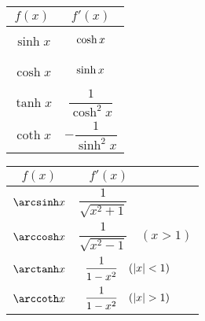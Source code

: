 \begin{blueBox}
\begin{minipage}{0.35\textwidth}
\begin{center}
    \end{center}
  \end{minipage}%
  \begin{minipage}{0.25\textwidth}
    \def\arraystretch{1.5}
    \begin{tabular}{c | c}
      $f(x)$    & $f'(x)$                                      \\ \toprule
      $\sinh x$ & $\cosh x \vphantom{\dfrac{1}{\sqrt{x^2-1}}}$ \\ [2mm]
      $\cosh x$ & $\sinh x \vphantom{\dfrac{1}{\sqrt{x^2-1}}}$ \\ [2mm]
      $\tanh x$ & $\dfrac{1}{\cosh^2 x}$                       \\ [2mm]
      $\coth x$ & $-\dfrac{1}{\sinh^2 x}$                      \\ \bottomrule
    \end{tabular}
  \end{minipage}%
  \begin{minipage}{0.4\textwidth}
    \def\arraystretch{1.5}
    \begin{tabular}{c | l}
      $f(x)$       & $\;\;\;f'(x)$                                             \\ \toprule
      $\arcsinh x$ & $\dfrac{1}{\sqrt{x^2+1}}$                                 \\ [2mm]
      $\arccosh x$ & $\dfrac{1}{\sqrt{x^2-1}} \;\;\;\, (x > 1)$                \\ [2mm]
      $\arctanh x$ & $\;\;\dfrac{1}{1-x^2 \vphantom{\cosh^2}} \quad (|x| < 1)$ \\ [2mm]
      $\arccoth x$ & $\;\;\dfrac{1}{1-x^2 \vphantom{\sinh^2}} \quad (|x| > 1)$ \\ \bottomrule
    \end{tabular}
  \end{minipage}
\end{blueBox}

